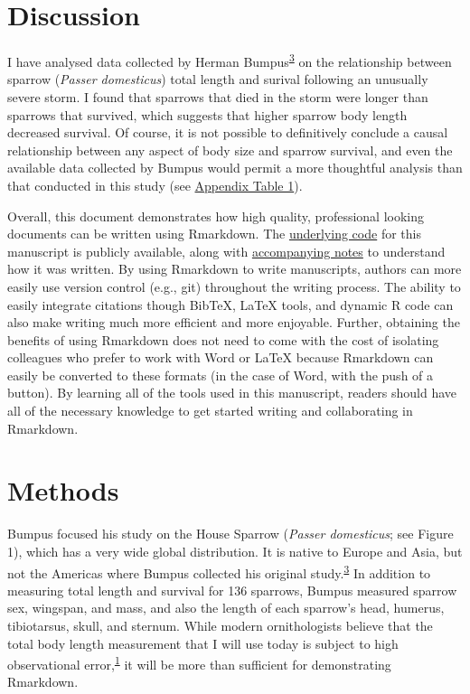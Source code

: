 \documentclass[
]{article}
\begin{document}
\clearpage

\hypertarget{discussion}{%
\section{Discussion}\label{discussion}}

I have analysed data collected by Herman Bumpus\textsuperscript{\protect\hyperlink{ref-Bumpus1898}{3}} on the relationship between sparrow (\emph{Passer domesticus}) total length and surival following an unusually severe storm. I found that sparrows that died in the storm were longer than sparrows that survived, which suggests that higher sparrow body length decreased survival. Of course, it is not possible to definitively conclude a causal relationship between any aspect of body size and sparrow survival, and even the available data collected by Bumpus would permit a more thoughtful analysis than that conducted in this study (see \protect\hyperlink{appendix}{Appendix Table 1}).

Overall, this document demonstrates how high quality, professional looking documents can be written using Rmarkdown. The \href{https://github.com/StirlingCodingClub/Manuscripts_in_Rmarkdown/blob/master/ms.Rmd}{underlying code} for this manuscript is publicly available, along with \href{https://stirlingcodingclub.github.io/Manuscripts_in_Rmarkdown/Rmarkdown_notes.html}{accompanying notes} to understand how it was written. By using Rmarkdown to write manuscripts, authors can more easily use version control (e.g., git) throughout the writing process. The ability to easily integrate citations though BibTeX, LaTeX tools, and dynamic R code can also make writing much more efficient and more enjoyable. Further, obtaining the benefits of using Rmarkdown does not need to come with the cost of isolating colleagues who prefer to work with Word or LaTeX because Rmarkdown can easily be converted to these formats (in the case of Word, with the push of a button). By learning all of the tools used in this manuscript, readers should have all of the necessary knowledge to get started writing and collaborating in Rmarkdown.

\clearpage

\hypertarget{methods}{%
\section{Methods}\label{methods}}

Bumpus focused his study on the House Sparrow (\emph{Passer domesticus}; see Figure 1), which has a very wide global distribution. It is native to Europe and Asia, but not the Americas where Bumpus collected his original study.\textsuperscript{\protect\hyperlink{ref-Bumpus1898}{3}} In addition to measuring total length and survival for 136 sparrows, Bumpus measured sparrow sex, wingspan, and mass, and also the length of each sparrow's head, humerus, tibiotarsus, skull, and sternum. While modern ornithologists believe that the total body length measurement that I will use today is subject to high observational error,\textsuperscript{\protect\hyperlink{ref-Johnston1972}{1}} it will be more than sufficient for demonstrating Rmarkdown.
\end{document}
